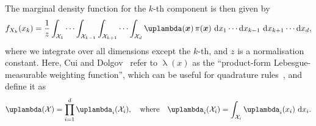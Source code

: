 The marginal density function for the $k$-th component is then given by
\begin{align}
	f_{X_k}(x_k) = \frac{1}{z} \int_{\mathcal{X}_1} \cdots \int_{\mathcal{X}_{k-1}} \int_{\mathcal{X}_{k+1}} \cdots  \int_{\mathcal{X}_d} \uplambda(\bm{x}) \, \pi(\bm{x}) \, \diff x_1 \cdots \diff x_{k-1} \, \diff x_{k+1} \cdots \diff x_d, \label{eq:margInt}
\end{align}
where we integrate over all dimensions except the $k$-th, and $z$ is a normalisation constant.
Here, Cui and Dolgov~\cite{cui2022deep} refer to $\uplambda(x)$ as the ``product-form Lebesgue-measurable weighting function'', which can be useful for quadrature rules~\cite{davis2007methods}, and define it as
\begin{align}
	\uplambda(\mathcal{X}) = \prod_{i = 1}^{d} \uplambda_i(\mathcal{X}_i), \quad \text{where} \quad \uplambda_i(\mathcal{X}_i) = \int_{\mathcal{X}_i} \uplambda_i(x_i) \, \diff x_i. \label{eq:lebesgueWeight}
\end{align}


